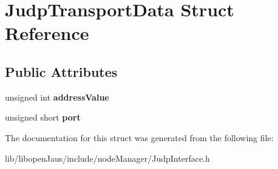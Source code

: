 \hypertarget{struct_judp_transport_data}{\section{\-Judp\-Transport\-Data \-Struct \-Reference}
\label{struct_judp_transport_data}
}
\subsection*{\-Public \-Attributes}
\begin{DoxyCompactItemize}
\item 
\hypertarget{struct_judp_transport_data_a717dc35ffce57d0ac51e4a0ea966c8ad}{unsigned int {\bfseries address\-Value}}\label{struct_judp_transport_data_a717dc35ffce57d0ac51e4a0ea966c8ad}

\item 
\hypertarget{struct_judp_transport_data_af8b341cf092b18cccfb47e021d3db19a}{unsigned short {\bfseries port}}\label{struct_judp_transport_data_af8b341cf092b18cccfb47e021d3db19a}

\end{DoxyCompactItemize}


\-The documentation for this struct was generated from the following file\-:\begin{DoxyCompactItemize}
\item 
lib/libopen\-Jaus/include/node\-Manager/\-Judp\-Interface.\-h\end{DoxyCompactItemize}
